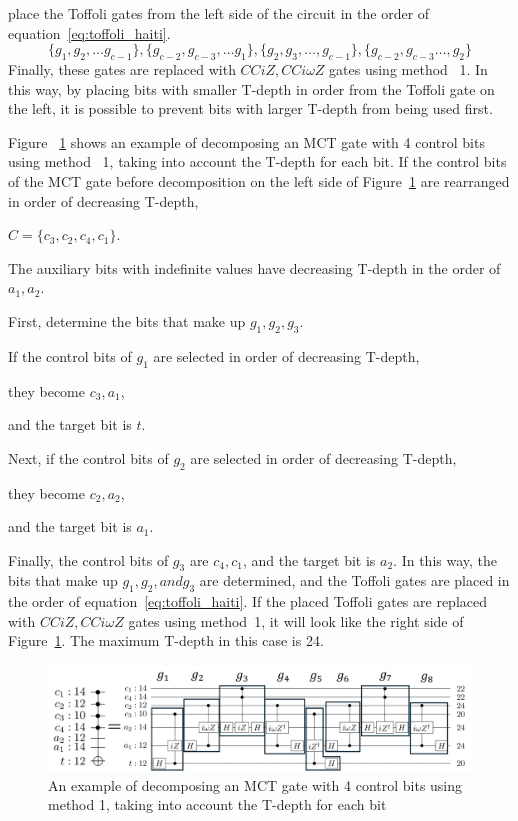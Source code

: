 place the Toffoli gates from the left side of the circuit in the order of equation~\ref{eq:toffoli_haiti}.
\begin{equation}\label{eq:toffoli_haiti}
\{g_{1}, g_{2}, \dots g_{c-1}\},\{g_{c-2},g_{c-3},\dots g_{1}\}, \{g_{2},g_{3},\dots ,g_{c-1}\}, \{g_{c-2}, g_{c-3}\dots ,g_{2}\}
\end{equation}
Finally, these gates are replaced with $CCiZ, CCi\omega Z$ gates using method ~1.
In this way, by placing bits with smaller T-depth in order from the Toffoli gate on the left,
it is possible to prevent bits with larger T-depth from being used first.
\par
Figure ~\ref{b2mapping_proposed} shows an example of decomposing an MCT gate with 4 control bits using method ~1, taking into account the T-depth for each bit.
If the control bits of the MCT gate before decomposition on the left side of Figure~\ref{b2mapping_proposed} are rearranged in order of decreasing T-depth,

$C=\{c_{3}, c_{2}, c_{4}, c_{1}\}$.

The auxiliary bits with indefinite values have decreasing T-depth in the order of $a_{1}, a_{2}$.

First, determine the bits that make up $g_{1}, g_{2}, g_{3}$.

If the control bits of $g_{1}$ are selected in order of decreasing T-depth,

they become $c_{3}, a_{1}$,

and the target bit is $t$.

Next, if the control bits of $g_{2}$ are selected in order of decreasing T-depth,

they become $c_{2}, a_{2}$,

and the target bit is $a_{1}$.

Finally, the control bits of $g_{3}$ are $c_{4}, c_{1}$,
and the target bit is $a_{2}$.
In this way, the bits that make up $g_{1}, g_{2}, and g_{3}$ are determined,
and the Toffoli gates are placed in the order of equation~\ref{eq:toffoli_haiti}.
If the placed Toffoli gates are replaced with $CCiZ, CCi\omega Z$ gates using method~1,
it will look like the right side of Figure~\ref{b2mapping_proposed}. The maximum T-depth in this case is 24.
\begin{figure}
\centering
\includegraphics[width=18cm]{img/b2_mapping_proposed.pdf}
\caption{An example of decomposing an MCT gate with 4 control bits using method 1, taking into account the T-depth for each bit}
\label{b2mapping_proposed}
\end{figure}

